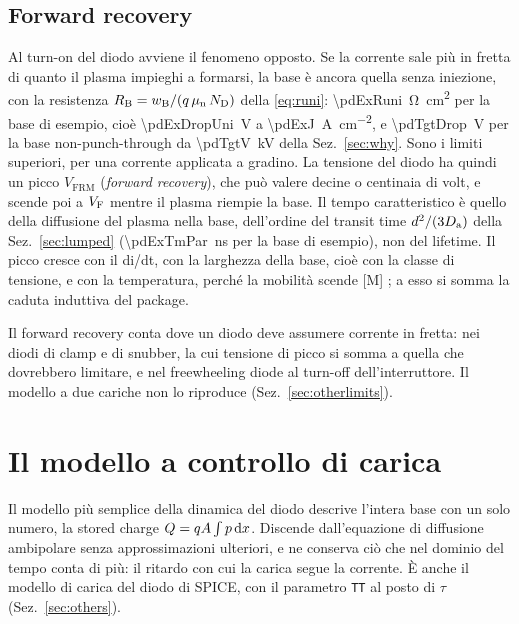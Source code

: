 \documentclass[10pt,a4paper]{scrartcl}
\let\newcommand\pdvaluedefine
\newcommand{\VF}{V_\mathrm{F}}
\newcommand{\diff}{\mathrm{d}}
\newcommand{\ND}{N_\mathrm{D}}
\newcommand{\wB}{w_\mathrm{B}}
\newcommand{\Da}{D_\mathrm{a}}
\newcommand{\mun}{\mu_\mathrm{n}}
\begin{document}
\subsection{Forward recovery}
\label{sec:forwardrec}
Al turn-on del diodo avviene il fenomeno opposto. Se la corrente sale più in fretta di quanto il plasma impieghi a formarsi, la base è ancora quella senza iniezione, con la resistenza $R_\mathrm{B} = \wB/(q\,\mun\,\ND)$ della \eqref{eq:runi}: \SI{\pdExRuni}{\ohm\centi\metre\squared} per la base di esempio, cioè \SI{\pdExDropUni}{\volt} a \SI{\pdExJ}{\ampere\per\centi\metre\squared}, e \SI{\pdTgtDrop}{\volt} per la base non-punch-through da \SI{\pdTgtV}{\kilo\volt} della Sez.~\ref{sec:why}. Sono i limiti superiori, per una corrente applicata a gradino. La tensione del diodo ha quindi un picco $V_\mathrm{FRM}$ (\emph{forward recovery}), che può valere decine o centinaia di volt, e scende poi a $\VF$ mentre il plasma riempie la base. Il tempo caratteristico è quello della diffusione del plasma nella base, dell'ordine del transit time $d^2/(3\Da)$ della Sez.~\ref{sec:lumped} (\SI{\pdExTmPar}{\nano\second} per la base di esempio), non del lifetime. Il picco cresce con il di/dt, con la larghezza della base, cioè con la classe di tensione, e con la temperatura, perché la mobilità scende [M] \cite{lutz}; a esso si somma la caduta induttiva del package.

Il forward recovery conta dove un diodo deve assumere corrente in fretta: nei diodi di clamp e di snubber, la cui tensione di picco si somma a quella che dovrebbero limitare, e nel freewheeling diode al turn-off dell'interruttore. Il modello a due cariche non lo riproduce (Sez.~\ref{sec:otherlimits}).
\section{Il modello a controllo di carica}
\label{sec:chargecontrol}
Il modello più semplice della dinamica del diodo descrive l'intera base con un solo numero, la stored charge $Q = qA\int p\,\diff x$. Discende dall'equazione di diffusione ambipolare senza approssimazioni ulteriori, e ne conserva ciò che nel dominio del tempo conta di più: il ritardo con cui la carica segue la corrente. È anche il modello di carica del diodo di SPICE, con il parametro \texttt{TT} al posto di $\tau$ (Sez.~\ref{sec:others}).
\end{document}
